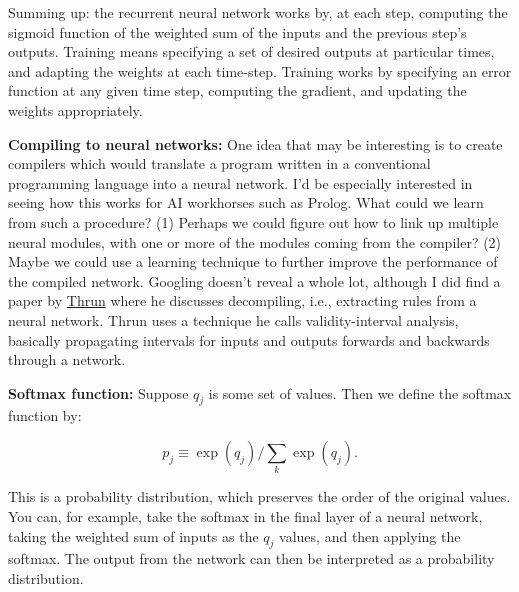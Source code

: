 \documentclass[12pt]{article}
\newcommand{\link}[2]{\href{#1}{#2}}
\begin{document}
  Summing up: the recurrent neural network works by, at each step,
  computing the sigmoid function of the weighted sum of the inputs and
  the previous step's outputs.  Training means specifying a set of
  desired outputs at particular times, and adapting the weights at
  each time-step.  Training works by specifying an error function at
  any given time step, computing the gradient, and updating the
  weights appropriately.

\textbf{Compiling to neural networks:} One idea that may be
  interesting is to create compilers which would translate a program
  written in a conventional programming language into a neural
  network.  I'd be especially interested in seeing how this works for
  AI workhorses such as Prolog.  What could we learn from such a
  procedure?  (1) Perhaps we could figure out how to link up multiple
  neural modules, with one or more of the modules coming from the
  compiler? (2) Maybe we could use a learning technique to further
  improve the performance of the compiled network.  Googling doesn't
  reveal a whole lot, although I did find a paper by
  \link{http://scholar.google.ca/scholar?cluster=10518384657895134615\&hl=en\&as\_sdt=0,5}{Thrun}
  where he discusses decompiling, i.e., extracting rules from a neural
  network.  Thrun uses a technique he calls validity-interval
  analysis, basically propagating intervals for inputs and outputs
  forwards and backwards through a network.

\textbf{Softmax function:} Suppose $q_j$ is some set of values.  Then
  we define the softmax function by:

$$p_j \equiv \exp(q_j)/\sum_k \exp(q_j).$$
  
This is a probability distribution, which preserves the order of the
original values.  You can, for example, take the softmax in the final
layer of a neural network, taking the weighted sum of inputs as the
$q_j$ values, and then applying the softmax.  The output from the
network can then be interpreted as a probability distribution.
\end{document}
